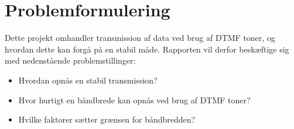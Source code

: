 \newpage
\section{Problemformulering}
Dette projekt omhandler transmission af data ved brug af DTMF toner, og hvordan dette kan forgå på en stabil måde. Rapporten vil derfor beskæftige sig med nedenstående problemstillinger:

\begin{itemize}[noitemsep]
	\item	Hvordan opnås en stabil transmission?
	\item	Hvor hurtigt en båndbrede kan opnås ved brug af DTMF toner?
	\item Hvilke faktorer sætter grænsen for båndbredden?


\end{itemize}
